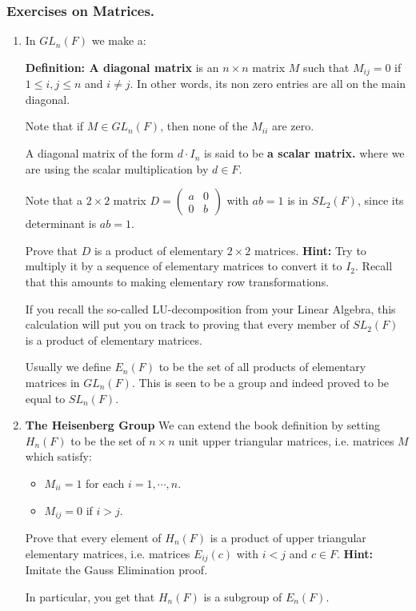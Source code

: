 \documentclass[12pt]{article}
\newcommand{\deff}[1]{{\bf Definition: #1} }
\newcommand{\matr}[2]{\left( \begin{array}{*{#1}{r}}#2\end{array}\right)}
\begin{document}
\subsubsection{Exercises on Matrices.}
\begin{enumerate}
\item In $GL_n(F)$ we make a:

\deff{A diagonal matrix} is an $n \times n $  matrix $M$ such that
$M_{ij}=0$ if $1\leq i,j \leq n$ and $i \neq j$. In other words, its 
non zero entries are all on the main diagonal.

Note that if $M\in GL_n(F)$, then none of the $M_{ii}$ are zero.

A diagonal matrix of the form $d\cdot I_n$ is said to be {\bf a scalar
matrix.}
where we are using the scalar multiplication by $d\in F$.

Note that a $2\times 2$ matrix $D=\matr{2}{a & 0 \\ 0 & b}$ with $ab=1$
is in $SL_2(F)$, since its determinant is $ab=1$.

Prove that $D$ is a product of elementary $2\times 2$ matrices.
{\bf Hint:} Try to multiply it by a sequence of elementary matrices to
convert it to $I_2$. Recall that this amounts to making elementary row
transformations.

If you recall the so-called LU-decomposition from your Linear Algebra,
this calculation will put you on track to proving that every member of
$SL_2(F)$ is a product of elementary matrices. 

Usually we define $E_n(F)$ to be the set of all products of elementary 
matrices in $GL_n(F)$. This is seen to be a group and indeed proved to
be equal to $SL_n(F)$.

\item {\bf The Heisenberg Group}
We can extend the book definition by setting $H_n(F)$ to be the set of
$n \times n$ unit upper triangular matrices, i.e. matrices $M$ which
satisfy:
\begin{itemize}
\item $M_{ii}=1$ for each $i=1,\cdots,n$.
\item $M_{ij}=0$ if $i>j$.
\end{itemize}

Prove that every element of $H_n(F)$ is a product of upper triangular
elementary matrices, i.e. matrices $E_{ij}(c)$ with $i<j$ and $c\in F$.
{\bf Hint:} Imitate the Gauss Elimination proof.

In particular, you get that $H_n(F)$ is a subgroup of $E_n(F)$.


\end{enumerate}
\end{document}
